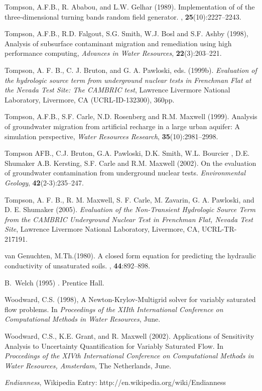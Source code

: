 \begin{thebibliography}{99}
Tompson, A.F.B., R. Ababou, and L.W. Gelhar (1989).
\newblock Implementation of of the three-dimensional turning bands random field
  generator.
, {\bf 25}(10):2227--2243.

  Tompson, A.F.B., R.D. Falgout, S.G. Smith, W.J. Bosl and
S.F. Ashby (1998), Analysis of subsurface contaminant migration and
remediation using high performance computing, {\em Advances in Water
Resources}, { \bf 22}(3):203--221.

Tompson, A. F. B., C. J. Bruton, and G. A. Pawloski, eds. (1999b). {\em Evaluation of the hydrologic source term from underground nuclear tests in Frenchman Flat at the Nevada Test Site: The CAMBRIC test}, Lawrence Livermore National Laboratory, Livermore, CA (UCRL-ID-132300), 360pp. 

  Tompson, A.F.B., S.F. Carle, N.D. Rosenberg and R.M. Maxwell
 (1999). Analysis of groundwater migration from artificial recharge in a large
 urban aquifer: A simulation perspective, {\em Water Resources
Research}, {\bf 35}(10):2981--2998.

Tompson AFB., C.J. Bruton, G.A. Pawloski, D.K. Smith, W.L. Bourcier , D.E. Shumaker A.B. Kersting, S.F. Carle and R.M. Maxwell (2002). On the evaluation of groundwater contamination from underground nuclear tests.  {\em Environmental Geology}, {\bf 42}(2-3):235--247.

Tompson, A. F. B., R. M. Maxwell, S. F. Carle, M. Zavarin, G. A. Pawloski, and D. E. Shumaker (2005). {\em Evaluation of the Non-Transient Hydrologic Source Term from the CAMBRIC Underground Nuclear Test in Frenchman Flat, Nevada Test Site}, Lawrence Livermore National Laboratory, Livermore, CA, UCRL-TR-217191.

{van Genuchten}, M.Th.(1980). 
\newblock A closed form equation for predicting the hydraulic conductivity of
  unsaturated soils.
, {\bf 44}:892--898.

B.~Welch (1995)
.
\newblock Prentice Hall.

Woodward, C.S. (1998),
\newblock A {N}ewton-{K}rylov-{M}ultigrid solver for variably saturated flow
  problems.
\newblock In {\em Proceedings of the XIIth International Conference on
  Computational Methods in Water Resources}, June.

Woodward, C.S., K.E. Grant, and R. Maxwell (2002). Applications of Sensitivity Analysis to Uncertainty Quantification for Variably Saturated Flow.
\newblock In {\em Proccedings of the XIVth International Conference on Computational Methods in Water Resources, Amsterdam}, The Netherlands, June.

{\em Endianness}, Wikipedia Entry: http://en.wikipedia.org/wiki/Endianness
\end{thebibliography}
